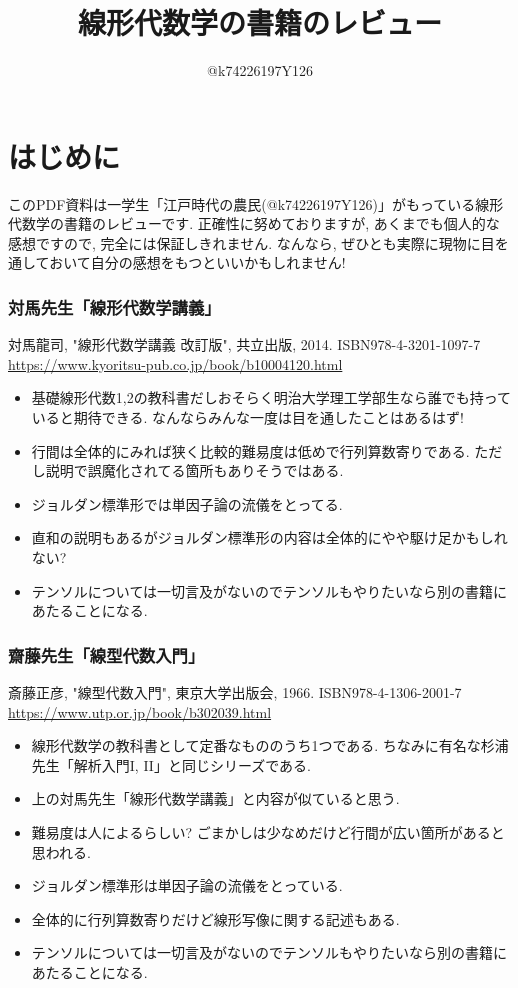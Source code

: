 \documentclass[10pt,a4paper]{jsarticle}
\title{線形代数学の書籍のレビュー}
\author{@k74226197Y126}
\begin{document}
\maketitle
\section*{はじめに}
このPDF資料は一学生「江戸時代の農民(@k74226197Y126)」がもっている線形代数学の書籍のレビューです. 正確性に努めておりますが, あくまでも個人的な感想ですので, 完全には保証しきれません. なんなら, ぜひとも実際に現物に目を通しておいて自分の感想をもつといいかもしれません! 
\subsubsection*{対馬先生「線形代数学講義」}
対馬龍司, "線形代数学講義 改訂版", 共立出版, 2014. ISBN978-4-3201-1097-7 \url{https://www.kyoritsu-pub.co.jp/book/b10004120.html}
\begin{itemize}
    \item 基礎線形代数1,2の教科書だしおそらく明治大学理工学部生なら誰でも持っていると期待できる. なんならみんな一度は目を通したことはあるはず! 
    \item 行間は全体的にみれば狭く比較的難易度は低めで行列算数寄りである. ただし説明で誤魔化されてる箇所もありそうではある. 
    \item ジョルダン標準形では単因子論の流儀をとってる. 
    \item 直和の説明もあるがジョルダン標準形の内容は全体的にやや駆け足かもしれない? 
    \item テンソルについては一切言及がないのでテンソルもやりたいなら別の書籍にあたることになる. 
\end{itemize}
\subsubsection*{齋藤先生「線型代数入門」}
斎藤正彦, "線型代数入門", 東京大学出版会, 1966. ISBN978-4-1306-2001-7 \url{https://www.utp.or.jp/book/b302039.html}
\begin{itemize}
    \item 線形代数学の教科書として定番なもののうち1つである. ちなみに有名な杉浦先生「解析入門I, II」と同じシリーズである. 
    \item 上の対馬先生「線形代数学講義」と内容が似ていると思う. 
    \item 難易度は人によるらしい? ごまかしは少なめだけど行間が広い箇所があると思われる. 
    \item ジョルダン標準形は単因子論の流儀をとっている. 
    \item 全体的に行列算数寄りだけど線形写像に関する記述もある. 
    \item テンソルについては一切言及がないのでテンソルもやりたいなら別の書籍にあたることになる. 
\end{itemize}
\end{document}
